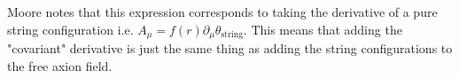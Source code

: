 \documentclass[a4paper]{article}
\begin{document}
Moore notes that this expression corresponds to taking the derivative of a pure string configuration i.e.
$A_\mu = f(r) \partial_\mu \theta_{\mathrm{string}}$.
This means that adding the "covariant" derivative is just the same thing as adding the string configurations to the free axion field.






\newpage
\printbibliography
\end{document}
